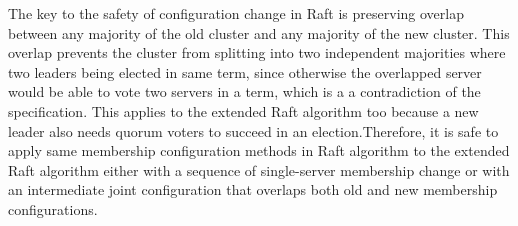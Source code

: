 The key to the safety of configuration change in Raft is preserving overlap between any majority of the old cluster and any majority of the new cluster. This overlap prevents the cluster from splitting into two independent majorities where two leaders being elected in same term, since otherwise the overlapped server would be able to vote two servers in a term, which is a a contradiction of the specification. This applies to the extended Raft algorithm too because a new leader also needs quorum voters to succeed in an election.Therefore, it is safe to apply same membership configuration methods in Raft algorithm to the extended Raft algorithm either with a sequence of single-server membership change or with an intermediate joint configuration that overlaps both old and new membership configurations.